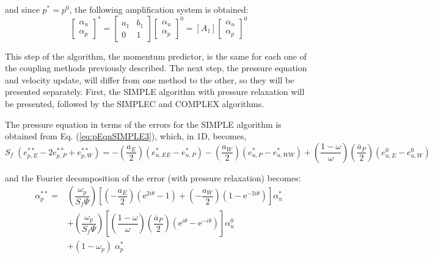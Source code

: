 \documentclass[final,3p,times,11pt,onecolumn]{myElsarticle}
\numberwithin{equation}{section}
\begin{document}
\noindent and since $p^* = p^0$, the following amplification system is obtained:
\begin{equation}
\begin{bmatrix}
\alpha_u \\
\alpha_p 
\end{bmatrix}^{*} =
\begin{bmatrix}
a_1 & b_1 \\
0 & 1
\end{bmatrix}
\begin{bmatrix}
\alpha_u \\
\alpha_p 
\end{bmatrix}^{0} =
[A_1]
\begin{bmatrix}
\alpha_u \\
\alpha_p 
\end{bmatrix}^{0}
\end{equation}

This step of the algorithm, the momentum predictor, is the same for each one of the coupling methods previously described. The next step, the pressure equation and velocity update, will differ from one method to the other, so they will be presented separately. First, the SIMPLE algorithm with pressure relaxation will be presented, followed by the SIMPLEC and COMPLEX algorithms.

The pressure equation in terms of the errors for the SIMPLE algorithm is obtained from Eq. (\ref{eq:pEqnSIMPLE3}), which, in 1D, becomes,
\begin{equation}
    S_f \; (e_{p,E}^{**} - 2 e_{p,P}^{**} + e_{p,W}^{**}) = 
     -\left(\dfrac{a_E}{2}\right) (e_{u,EE}^* - e_{u,P}^*) 
    -\left(\dfrac{a_W}{2}\right) (e_{u,P}^* - e_{u,WW}^*)  +
    \left( \dfrac{1-\omega}{\omega} \right) \left(\dfrac{\overline{a}_P}{2}\right) (e_{u,E}^0 - e_{u,W}^0)
\end{equation}

\noindent and the Fourier decomposition of the error (with pressure relaxation) becomes:
\begin{equation}
\begin{split}
    \alpha_p^{**} = &\left( \dfrac{\omega_p}{S_f \Psi} \right) 
                    \left[ \left(-\dfrac{a_E}{2} \right) \left(\text{e}^{2 i \theta} - 1 \right) +
                            \left(-\dfrac{a_W}{2} \right) \left(1 - \text{e}^{-2 i \theta}\right)
                    \right] \alpha_u^{*} \\
                    & + \left( \dfrac{\omega_p}{S_f \Psi} \right) 
                    \left[ \left(\dfrac{1-\omega}{\omega} \right) \left(\dfrac{\overline{a}_P}{2} \right) \left(\text{e}^{i \theta} - \text{e}^{- i \theta} \right) 
                    \right] \alpha_u^{0} \\
                    & + (1-\omega_p) \; \alpha_p^*    
\end{split}
\end{equation}
\end{document}
